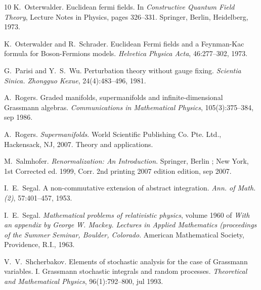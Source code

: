 \documentclass{article}
\newcommand{\tmtextit}[1]{{\itshape{#1}}}
\begin{document}
\begin{thebibliography}{10}
  K.~Osterwalder. {\newblock}Euclidean
  fermi fields. {\newblock}In \tmtextit{Constructive Quantum Field Theory},
  Lecture Notes in Physics,  pages  326--331. Springer, Berlin, Heidelberg,
  1973.{\newblock}
  
  K.~Osterwalder  and  R.~Schrader.
  {\newblock}Euclidean Fermi fields and a Feynman-Kac formula for
  Boson-Fermions models. {\newblock}\tmtextit{Helvetica Physica Acta},
  46:277--302, 1973.{\newblock}
  
  G.~Parisi  and  Y.~S.~Wu.
  {\newblock}Perturbation theory without gauge fixing.
  {\newblock}\tmtextit{Scientia Sinica. Zhongguo Kexue}, 24(4):483--496,
  1981.{\newblock}
  
  A.~Rogers. {\newblock}Graded manifolds,
  supermanifolds and infinite-dimensional Grassmann algebras.
  {\newblock}\tmtextit{Communications in Mathematical Physics},
  105(3):375--384, sep 1986.{\newblock}
  
  A.~Rogers. {\newblock}\tmtextit{Supermanifolds}.
  {\newblock}World Scientific Publishing Co. Pte. Ltd., Hackensack, NJ, 2007.
  {\newblock}Theory and applications.{\newblock}
  
  M.~Salmhofer.
  {\newblock}\tmtextit{Renormalization: An Introduction}. {\newblock}Springer,
  Berlin ; New York, 1st Corrected ed. 1999, Corr. 2nd printing 2007 edition 
  edition, sep 2007.{\newblock}
  
  I.~E.~Segal. {\newblock}A non-commutative extension of
  abstract integration. {\newblock}\tmtextit{Ann. of Math. (2)}, 57:401--457,
  1953.{\newblock}
  
  I.~E.~Segal. {\newblock}\tmtextit{Mathematical
  problems of relativistic physics},  volume  1960  of \tmtextit{With an
  appendix by George W. Mackey. Lectures in Applied Mathematics (proceedings
  of the Summer Seminar, Boulder, Colorado}. {\newblock}American Mathematical
  Society, Providence, R.I., 1963.{\newblock}
  
  V.~V.~Shcherbakov.
  {\newblock}Elements of stochastic analysis for the case of Grassmann
  variables. I. Grassmann stochastic integrals and random processes.
  {\newblock}\tmtextit{Theoretical and Mathematical Physics}, 96(1):792--800,
  jul 1993.{\newblock}
  

\end{thebibliography}
\end{document}
